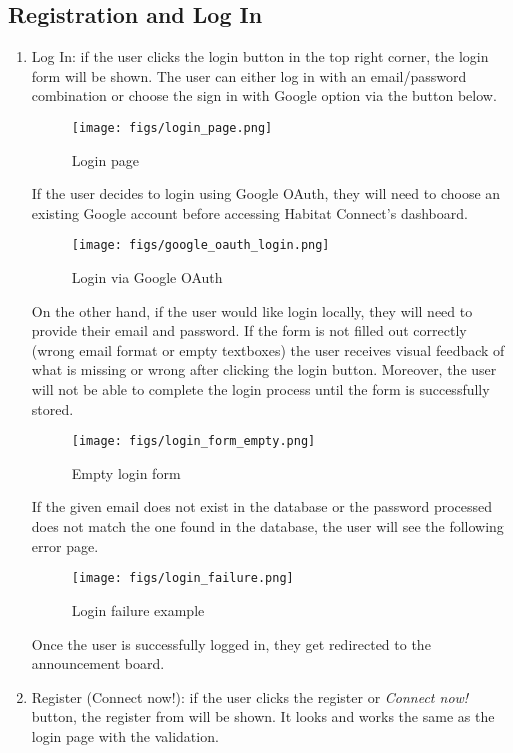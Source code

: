 \documentclass[conference]{IEEEtran}
\begin{document}
\subsection{Registration and Log In}
\begin{enumerate}
    \item Log In: if the user clicks the login button in the top right corner, the login form will be shown. The user can either log in with an email/password combination or choose the sign in with Google option via the button below.
    \begin{figure}[H]
    \centering
    \texttt{[image: figs/login\_page.png]}
    \caption{Login page}
    \label{fig:Login page}
    \end{figure}
    If the user decides to login using Google OAuth, they will need to choose an existing Google account before accessing Habitat Connect’s dashboard.
    \begin{figure}[H]
    \centering
    \texttt{[image: figs/google\_oauth\_login.png]}
    \caption{Login via Google OAuth}
    \label{fig:Google OAuth Login}
    \end{figure}
    On the other hand, if the user would like login locally, they will need to provide their email and password. If the form is not filled out correctly (wrong email format or empty textboxes) the user receives visual feedback of what is missing or wrong after clicking the login button. Moreover, the user will not be able to complete the login process until the form is successfully stored.
    \begin{figure}[H]
    \centering
    \texttt{[image: figs/login\_form\_empty.png]}
    \caption{Empty login form}
    \label{fig:Empty login form}
    \end{figure}
    If the given email does not exist in the database or the password processed does not match the one found in the database, the user will see the following error page.
    \begin{figure}[H]
    \centering
    \texttt{[image: figs/login\_failure.png]}
    \caption{Login failure example}
    \label{fig:Login failure example}
    \end{figure}
    Once the user is successfully logged in, they get redirected to the announcement board.
    \item Register (Connect now!): if the user clicks the register or \textit{Connect now!} button, the register from will be shown. It looks and works the same as the login page with the validation.

\end{enumerate}
\end{document}
